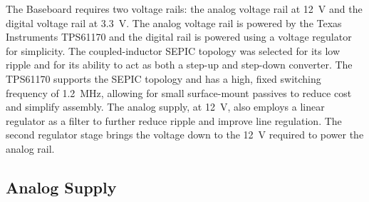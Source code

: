 \documentclass[12pt, titlepage]{/home/air/projects/latex-template/tex-template}
\begin{document}
The Baseboard requires two voltage rails: the analog voltage rail at \SI{12}{\volt} and the digital voltage rail at \SI{3.3}{\volt}. The analog voltage rail is powered by the Texas Instruments TPS61170 and the digital rail is powered using a voltage regulator for simplicity. The coupled-inductor SEPIC topology was selected for its low ripple and for its ability to act as both a step-up and step-down converter. The TPS61170 supports the SEPIC topology and has a high, fixed switching frequency of \SI{1.2}{\mega\hertz}, allowing for small surface-mount passives to reduce cost and simplify assembly. The analog supply, at \SI{12}{\volt}, also employs a linear regulator as a filter to further reduce ripple and improve line regulation. The second regulator stage brings the voltage down to the \SI{12}{\volt} required to power the analog rail.

\subsection{Analog Supply}
\end{document}
